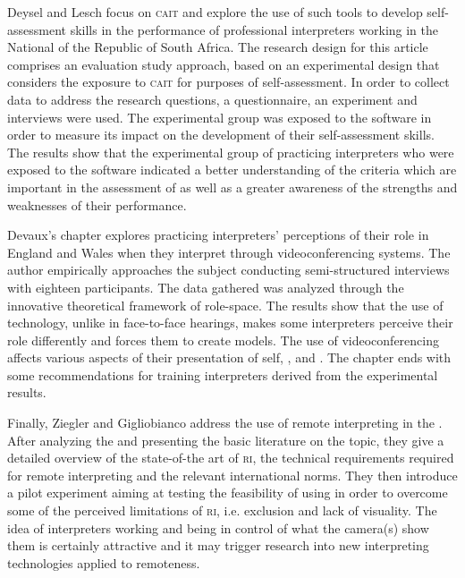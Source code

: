 \documentclass[output=paper]{langsci/langscibook}
\begin{document}
Deysel and Lesch focus on \textsc{cait} and explore the use of such tools to develop self-assessment skills in the performance of professional interpreters working in the National  of the Republic of South Africa. The research design for this article comprises an evaluation study approach, based on an experimental design that considers the exposure to \textsc{cait} for purposes of self-assessment. In order to collect data to address the research questions, a questionnaire, an experiment and interviews were used. The experimental group was exposed to the software \textit{} in order to measure its impact on the development of their self-assessment skills. The results show that the experimental group of practicing interpreters who were exposed to the software indicated a better understanding of the criteria which are important in the assessment of  as well as a greater awareness of the strengths and weaknesses of their performance. 
 
Devaux’s chapter explores practicing  interpreters’ perceptions of their role in England and Wales when they interpret through videoconferencing systems. The author empirically approaches the subject conducting semi-structured interviews with eighteen participants. The data gathered was analyzed through the innovative theoretical framework of role-space. The results show that the use of technology, unlike in face-to-face  hearings, makes some interpreters perceive their role differently and forces them to create  models. The use of videoconferencing  affects various aspects of their presentation of self, , and . The chapter ends with some recommendations for training  interpreters derived from the experimental results. 
 
Finally, Ziegler and Gigliobianco address the use of remote interpreting in the . After analyzing the  and presenting the basic literature on the topic, they give a detailed overview of the state-of-the art of \textsc{ri}, the technical requirements required for remote interpreting and the relevant international norms. They then introduce a pilot experiment aiming at testing the feasibility of using  in order to overcome some of the perceived limitations of \textsc{ri}, i.e. exclusion and lack of visuality. The idea of interpreters working and being in control of what the camera(s) show them is certainly attractive and it may trigger research into new interpreting technologies applied to remoteness. 
 
\end{document}
